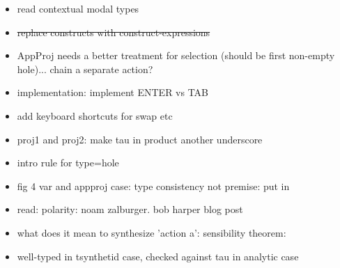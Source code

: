 \begin{itemize}
    \item read contextual modal types
    \item \sout{replace constructs with construct-expressions}
    \item AppProj needs a better treatment for selection (should be first non-empty hole)... chain a separate action?
    \item implementation: implement ENTER vs TAB
    \item add keyboard shortcuts for swap etc
    \item proj1 and proj2: make tau in product another underscore
    \item intro rule for type=hole
    \item fig 4 var and appproj case: type consistency not premise: put in 
    \item read: polarity: noam zalburger. bob harper blog post
    \item what does it mean to synthesize 'action a': sensibility theorem:
    \item well-typed in tsynthetid case, checked against tau in analytic case 
\end{itemize}

\newcommand{\singleton}[1]{\{ #1 \}}
\newcommand{\singleaction}[1]{\singleton{\mathtt{#1}}}
\newcommand{\varapparrow}[0]{\rightsquigarrow}
\newcommand{\varappjudge}[4]{#1 \vdash #2 \varapparrow #3 \Leftarrow #4}
\newcommand{\projjudge}[4]{#1 \vdash #2 \twoheadrightarrow #3 \Leftarrow #4}

